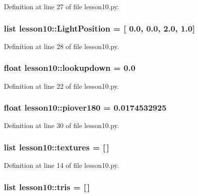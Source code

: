 Definition at line 27 of file lesson10.py.
\subsubsection{\setlength{\rightskip}{0pt plus 5cm}list {\bf lesson10::LightPosition} = [ 0.0, 0.0, 2.0, 1.0]\hspace{0.3cm}{\tt  [static]}}\label{namespacelesson10_9de8d14b64b0ad76c9e46603bf3a0de5}




Definition at line 28 of file lesson10.py.
\subsubsection{\setlength{\rightskip}{0pt plus 5cm}float {\bf lesson10::lookupdown} = 0.0\hspace{0.3cm}{\tt  [static]}}\label{namespacelesson10_c474d1ca3c2b89f208c5c677489bd917}




Definition at line 22 of file lesson10.py.
\subsubsection{\setlength{\rightskip}{0pt plus 5cm}float {\bf lesson10::piover180} = 0.0174532925\hspace{0.3cm}{\tt  [static]}}\label{namespacelesson10_c7a5603dfa65841994385e4b149030a1}




Definition at line 30 of file lesson10.py.
\subsubsection{\setlength{\rightskip}{0pt plus 5cm}list {\bf lesson10::textures} = [$\,$]\hspace{0.3cm}{\tt  [static]}}\label{namespacelesson10_4acff6da4231023efb77c3441d89aca2}




Definition at line 14 of file lesson10.py.
\subsubsection{\setlength{\rightskip}{0pt plus 5cm}list {\bf lesson10::tris} = [$\,$]\hspace{0.3cm}{\tt  [static]}}\label{namespacelesson10_904d4ac00d8025726ef27c822bcef9fa}




